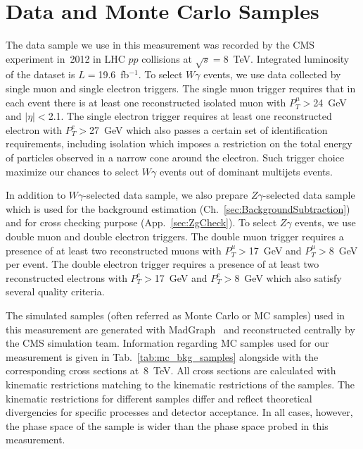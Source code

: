 \section{Data and Monte Carlo Samples}
\label{sec:DataAndMC}

The data sample we use in this measurement was recorded by the CMS experiment in~2012 in LHC $pp$ collisions at $\sqrt{s}=$8~TeV. Integrated luminosity of the dataset is $L=$19.6~fb$^{-1}$. To select $W\gamma$ events, we use data collected by single muon and single electron triggers. The single muon trigger requires that in each event there is at least one reconstructed isolated muon with $P_T^{\mu}>$24~GeV and $|\eta|<$2.1. The single electron trigger requires at least one reconstructed electron with $P_T^{e}>$27~GeV which also passes a certain set of identification requirements, including isolation which imposes a restriction on the total energy of particles observed in a narrow cone around the electron. Such trigger choice maximize our chances to select $W\gamma$ events out of dominant multijets events.

In addition to $W\gamma$-selected data sample, we also prepare $Z\gamma$-selected data sample which is used for the background estimation (Ch.~\ref{sec:BackgroundSubtraction}) and for cross checking purpose (App.~\ref{sec:ZgCheck}). To select $Z\gamma$ events, we use double muon and double electron triggers. The double muon trigger requires a presence of at least two reconstructed muons with $P_T^{\mu}>$17~GeV and $P_T^{\mu}>$8~GeV per event. The double electron trigger requires a presence of at least two reconstructed electrons with $P_T^{e}>$17~GeV and $P_T^{e}>$8~GeV which also satisfy several quality criteria.





The simulated samples (often referred as Monte Carlo or MC samples) used in this measurement are generated with MadGraph~\cite{ref_MadGraph} and reconstructed centrally by the CMS simulation team. Information regarding MC samples used for our measurement is given in Tab.~\ref{tab:mc_bkg_samples} alongside with the corresponding cross sections at~8~TeV. All cross sections are calculated with kinematic restrictions matching to the kinematic restrictions of the samples. The kinematic restrictions for different samples differ and reflect theoretical divergencies for specific processes and detector acceptance. In all cases, however, the phase space of the sample is wider than the phase space probed in this measurement.

